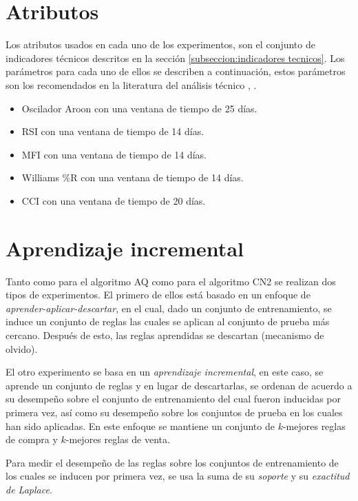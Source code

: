 \documentclass[12pt]{report}
\theoremstyle{break}
\theoremstyle{break}
\begin{document}
\section{Atributos}
\label{seccion:atributos}
Los atributos usados en cada uno de los experimentos, son el conjunto de indicadores técnicos descritos en la sección \ref{subseccion:indicadores tecnicos}. Los parámetros para cada uno de ellos se describen a continuación, estos parámetros son los recomendados en la literatura del análisis técnico \cite{encycoplediaTechnicalIndicators}, \cite{technicalAnalysisKirkPatrick}.


\begin{itemize}
\item Oscilador Aroon con una ventana de tiempo de 25 días.

\item RSI con una ventana de tiempo de 14 días.

\item MFI con una ventana de tiempo de 14 días.

\item Williams \%R con una ventana de tiempo de 14 días.

\item CCI con una ventana de tiempo de 20 días.
\end{itemize}


\section{Aprendizaje incremental}
\label{seccion:aprendizaje incremental}
Tanto como para el algoritmo AQ como para el algoritmo CN2 se realizan dos tipos de experimentos. El primero de ellos está basado en un enfoque de \textit{aprender-aplicar-descartar}, en el cual, dado un conjunto de entrenamiento, se induce un conjunto de reglas las cuales se aplican al conjunto de prueba más cercano. Después de esto, las reglas aprendidas se descartan (mecanismo de olvido).

El otro experimento se basa en un \textit{aprendizaje incremental}, en este caso, se aprende un conjunto de reglas y en lugar de descartarlas, se ordenan de acuerdo a su desempeño sobre el conjunto de entrenamiento del cual fueron inducidas por primera vez, así como su desempeño sobre los conjuntos de prueba en los cuales han sido aplicadas. En este enfoque se mantiene un conjunto de $k$-mejores reglas de compra y $k$-mejores reglas de venta.

Para medir el desempeño de las reglas sobre los conjuntos de entrenamiento de los cuales se inducen por primera vez, se usa la suma de su \textit{soporte} y su \textit{exactitud de Laplace}.
\end{document}
